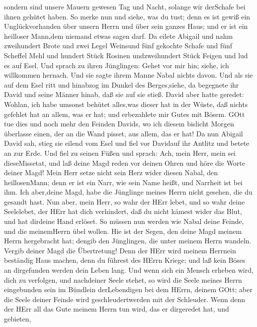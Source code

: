  sondern sind unsere Mauern gewesen Tag und Nacht, solange
wir derSchafe bei ihnen gehütet haben.  So merke nun und
siehe, was du tust; denn es ist gewiß ein Unglückvorhanden über unsern
Herrn und über sein ganzes Haus; und er ist ein heilloser Mann,dem
niemand etwas sagen darf.  Da eilete Abigail und nahm
zweihundert Brote und zwei Legel Weinsund fünf gekochte Schafe und fünf
Scheffel Mehl und hundert Stück Rosinen undzweihundert Stück Feigen und
lud es auf Esel.  Und sprach zu ihren Jünglingen: Gehet vor
mir hin; siehe, ich willkommen hernach. Und sie sagte ihrem Manne Nabal
nichts davon.  Und als sie auf dem Esel ritt und hinabzog
im Dunkel des Berges,siehe, da begegnete ihr David und seine Männer
hinab, daß sie auf sie stieß.  David aber hatte geredet:
Wohlan, ich habe umsonst behütet alles,was dieser hat in der Wüste, daß
nichts gefehlet hat an allem, was er hat; und erbezahlete mir Gutes mit
Bösem.  GOtt tue dies und noch mehr den Feinden Davids, wo
ich diesem bislicht Morgen überlasse einen, der an die Wand pisset, aus
allem, das er hat!  Da nun Abigail David sah, stieg sie
eilend vom Esel und fiel vor Davidauf ihr Antlitz und betete an zur
Erde.  Und fiel zu seinen Füßen und sprach: Ach, mein Herr,
mein sei dieseMissetat, und laß deine Magd reden vor deinen Ohren und
höre die Worte deiner Magd!  Mein Herr setze nicht sein
Herz wider diesen Nabal, den heillosenMann; denn er ist ein Narr, wie
sein Name heißt, und Narrheit ist bei ihm. Ich aber,deine Magd, habe die
Jünglinge meines Herrn nicht gesehen, die du gesandt hast. 
Nun aber, mein Herr, so wahr der HErr lebet, und so wahr deine
Seelelebet, der HErr hat dich verhindert, daß du nicht kämest wider das
Blut, und hat dirdeine Hand erlöset. So müssen nun werden wie Nabal
deine Feinde, und die meinemHerrn übel wollen.  Hie ist der
Segen, den deine Magd meinem Herrn hergebracht hat; dengib den
Jünglingen, die unter meinem Herrn wandeln.  Vergib deiner
Magd die Übertretung! Denn der HErr wird meinem Herrnein beständig Haus
machen, denn du führest des HErrn Kriege; und laß kein Böses an
dirgefunden werden dein Leben lang.  Und wenn sich ein
Mensch erheben wird, dich zu verfolgen, und nachdeiner Seele stehet, so
wird die Seele meines Herrn eingebunden sein im Bündlein derLebendigen
bei dem HErrn, deinem GOtt; aber die Seele deiner Feinde wird
geschleudertwerden mit der Schleuder.  Wenn denn der HErr
all das Gute meinem Herrn tun wird, das er dirgeredet hat, und gebieten,
